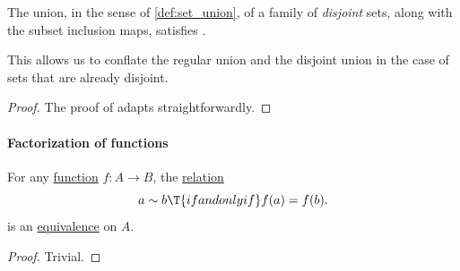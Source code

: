 \begin{proposition}\label{thm:disjoint_union_of_disjoint_sets}
  The union, in the sense of \cref{def:set_union}, of a family of \emph{disjoint} sets, along with the subset inclusion maps, satisfies .
\end{proposition}
\begin{comments}
  \item This allows us to conflate the regular union and the disjoint union in the case of sets that are already disjoint.
\end{comments}
\begin{proof}
  The proof of  adapts straightforwardly.
\end{proof}

\paragraph{Factorization of functions}

\begin{proposition}\label{thm:function_induces_equivalence}
  For any \hyperref[def:function]{function} \( f: A \to B \), the \hyperref[def:relation]{relation}
  \begin{equation}\label{eq:thm:function_induces_equivalence}
    a \sim b \T{if and only if} f(a) = f(b).
  \end{equation}
  is an \hyperref[def:equivalence_relation]{equivalence} on \( A \).
\end{proposition}
\begin{proof}
  Trivial.
\end{proof}

